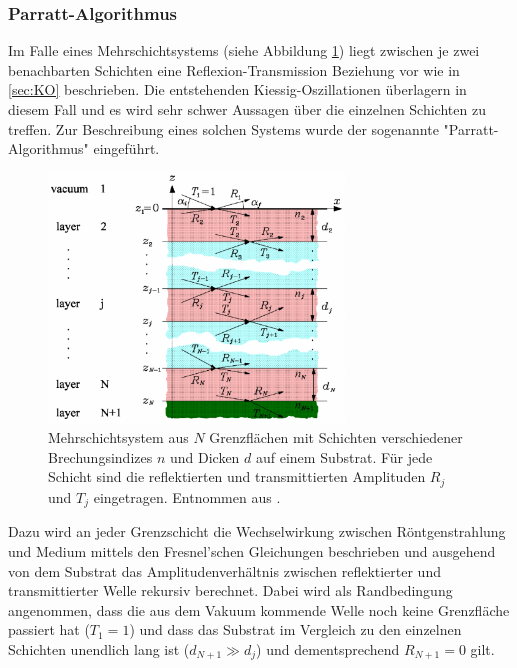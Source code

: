         \subsubsection{Parratt-Algorithmus}
            Im Falle eines Mehrschichtsystems (siehe Abbildung \ref{fig:Parratt}) liegt zwischen je zwei benachbarten Schichten eine Reflexion-Transmission Beziehung vor wie in \ref{sec:KO} beschrieben.
            Die entstehenden Kiessig-Oszillationen überlagern in diesem Fall und es wird sehr schwer Aussagen über die einzelnen Schichten zu treffen.
            Zur Beschreibung eines solchen Systems wurde der sogenannte "Parratt-Algorithmus" eingeführt.
            \begin{figure}[h]
                \centering
                \includegraphics[width = 0.7\textwidth]{pictures/Parratt.png}
                \caption{Mehrschichtsystem aus $N$ Grenzflächen mit Schichten verschiedener Brechungsindizes $n$ und Dicken $d$ auf einem Substrat.
                        Für jede Schicht sind die reflektierten und transmittierten Amplituden $R_j$ und $T_j$ eingetragen. Entnommen aus \cite{e1_tu_dortmund_versuchsanleitung_nodate}.}
                \label{fig:Parratt}
            \end{figure}
            Dazu wird an jeder Grenzschicht die Wechselwirkung zwischen Röntgenstrahlung und Medium mittels den Fresnel'schen Gleichungen beschrieben
            und ausgehend von dem Substrat das Amplitudenverhältnis zwischen reflektierter und transmittierter Welle rekursiv berechnet.
            Dabei wird als Randbedingung angenommen, dass die aus dem Vakuum kommende Welle noch keine Grenzfläche passiert hat ($T_1=1$)
            und dass das Substrat im Vergleich zu den einzelnen Schichten unendlich lang ist ($d_{N+1}\gg d_j$) und dementsprechend $R_{N+1}=0$ gilt.
